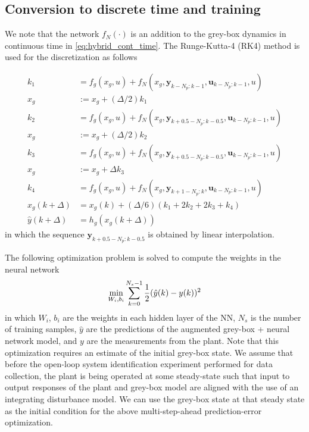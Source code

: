\documentclass{article}
\begin{document}
\subsection{Conversion to discrete time and training}
We note that the network $f_N(\cdot)$ is an addition 
to the grey-box dynamics in continuous time in \eqref{eq:hybrid_cont_time}. 
The Runge-Kutta-4 (RK4) method 
is used for the discretization as follows

\begin{align*}
  k_1 &= f_g(x_g, u) + 
  f_N(x_g, \mathbf{y}_{k-N_p:k-1}, \mathbf{u}_{k-N_p:k-1}, u) \\
  x_g & := x_g + (\Delta/2)k_1 \\
  k_2 &= f_g(x_g, u) + 
  f_N(x_g, \mathbf{y}_{k+0.5-N_p:k-0.5}, \mathbf{u}_{k-N_p:k-1}, u)\\
  x_g & := x_g + (\Delta/2)k_2 \\
  k_3 &= f_g(x_g, u) + 
  f_N(x_g, \mathbf{y}_{k+0.5-N_p:k-0.5}, \mathbf{u}_{k-N_p:k-1}, u)\\
  x_g & := x_g + \Delta k_3 \\
  k_4 &= f_g(x_g, u) + 
  f_N(x_g, \mathbf{y}_{k+1-N_p:k}, \mathbf{u}_{k-N_p:k-1}, u)\\
  x_g(k+\Delta) &= x_g(k) + (\Delta/6)(k_1 + 2k_2 + 2k_3 + k_4) \\
  \hat{y}(k+\Delta) &= h_g(x_g(k+\Delta)) 
\end{align*}
in which the sequence $\mathbf{y}_{k+0.5-N_p:k-0.5}$ is obtained by 
linear interpolation.

The following optimization problem is solved to compute 
the weights in the neural network
\begin{align*}
\underset{W_i, b_i}{\textnormal{min}} \sum_{k=0}^{N_s-1} 
\dfrac{1}{2}(\hat{y}(k) - y(k))^2
 \end{align*}
in which $W_i$, $b_i$ are the weights in each hidden layer of the NN, 
$N_s$ is the number of training samples, 
$\hat{y}$ are the predictions of the augmented
grey-box + neural network model, and $y$
are the measurements from the plant.
Note that this optimization requires an estimate 
of the initial grey-box state. We assume that 
before the open-loop system identification experiment 
performed for data collection, 
the plant is being operated at some 
steady-state such that input to output
responses of the plant and grey-box model are aligned with 
the use of an integrating disturbance model. We can use 
the grey-box state at that steady state as the initial condition 
for the above multi-step-ahead prediction-error
optimization.
\end{document}
